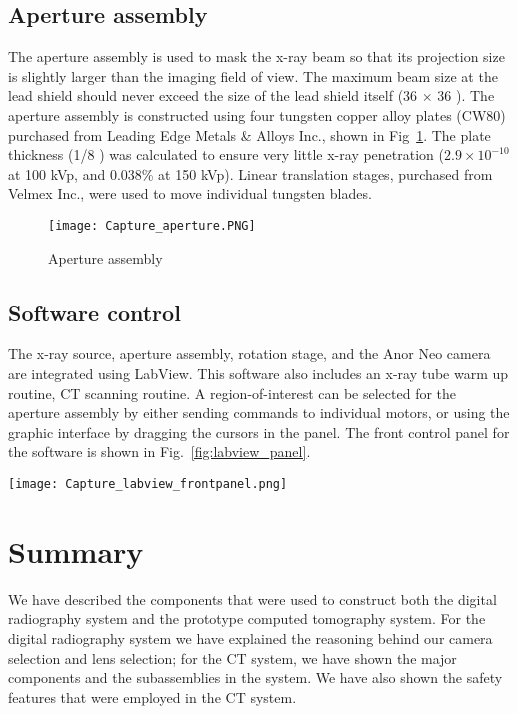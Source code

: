 \subsection{Aperture assembly}
The aperture assembly is used to mask the x-ray beam so that its projection size is slightly larger than the imaging field of view.  The maximum beam size at the lead shield should never exceed the size of the lead shield itself (36 \inches $\times$ 36 \inches).  The aperture assembly is constructed using four tungsten copper alloy plates (CW80) purchased from Leading Edge Metals \& Alloys Inc., shown in Fig~\ref{fig:aperture}.  The plate thickness (1/8 \inches) was calculated to ensure very little x-ray penetration ($2.9\times10^{-10}$ at 100 kVp, and 0.038\% at 150 kVp).  Linear translation stages, purchased from Velmex Inc., were used to move individual tungsten blades.
%
\begin{figure}[h]
\centering
\texttt{[image: Capture\_aperture.PNG]}
\caption{Aperture assembly}
\label{fig:aperture}
\end{figure}

\subsection{Software control}
The x-ray source, aperture assembly, rotation stage, and the Anor Neo camera are integrated using LabView.  This software also includes an x-ray tube warm up routine, CT scanning routine.  A region-of-interest can be selected for the aperture assembly by either sending commands to individual motors, or using the graphic interface by dragging the cursors in the panel.  The front control panel for the software is shown in Fig.~\ref{fig:labview_panel}. 

\begin{sidewaysfigure}
\texttt{[image: Capture\_labview\_frontpanel.png]}
\caption{Software control panel for the system.}
\label{fig:labview_panel}
\end{sidewaysfigure}

\section{Summary}
We have described the components that were used to construct both the digital radiography system and the prototype computed tomography system.  For the digital radiography system we have explained the reasoning behind our camera selection and lens selection; for the CT system, we have shown the major components and the subassemblies in the system.  We have also shown the safety features that were employed in the CT system.  